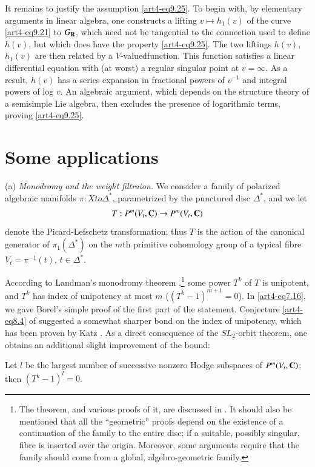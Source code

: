 It remains to justify the assumption \eqref{art4-eq9.25}. To begin with, by elementary arguments in linear algebra, one constructs a lifting $v \longmapsto h_1 (v)$ of the curve \eqref{art4-eq9.21} to $G_{\mathbf{R}}$, which need not be tangential to the connection used to define $h(v)$, but which does have the property \eqref{art4-eq9.25}. The two liftings $h(v)$, $h_1 (v)$ are then related by a $V$-valued\pageoriginale function. This function satisfies a linear differential equation with (at worst) a regular singular point at $v = \infty$. As a result, $h(v)$ has a series expansion in fractional powers of $v^{-1}$ and integral powers of log $v$. An algebraic argument, which depends on the structure theory of a semisimple Lie algebra, then excludes the presence of logarithmic terms, proving \eqref{art4-eq9.25}.


\section{Some applications}\label{art4-sec10}
(a) \textit{Monodromy and the weight filtraion.} We consider a family of polarized algebraic manifolds $\pi: X to \Delta^\ast$, parametrized by the punctured disc $\Delta^\ast$, and we let
$$
T : P^m (V_t, \mathbf{C}) \to P^m (V_t, \mathbf{C})
$$
denote the Picard-Lefschetz transformation; thus $T$ is the action of the canonical generator of $\pi_1 (\Delta^\ast)$ on the $m$th primitive cohomology group of a typical fibre $V_t = \pi^{-1} (t)$, $ t \in \Delta^\ast$.
              
According to Landman's monodromy theorem \cite{art4-key35},\footnote[41]{The theorem, and various proofs of it, are discussed in \cite{art4-key21}. It should also be mentioned that all the ``geometric'' proofs depend on the existence of a continuation of the family to the entire disc; if a suitable, possibly singular, fibre is inserted over the origin. Moreover, some arguments require that the family should come from a global, algebro-geometric family.} some power $T^k$ of $T$ is unipotent, and $T^k$ has index of unipotency at most $m$ (\ie $(T^k -1)^{m+1} =0$). In \eqref{art4-eq7.16}, we gave Borel's simple proof of the first part of the statement. Conjecture \eqref{art4-eq8.4} of \cite{art4-key21} suggested a somewhat sharper bond on the index of unipotency, which has been proven by Katz \cite{art4-key31}. As a direct consequence of the $SL_2$-orbit theorem, one obtains an additional slight improvement of the bound:

\setcounter{proposition}{0}
\begin{proposition}\label{art4-prop10.1}
Let $l$ be the largest number of successive nonzero Hodge subspaces of $P^m (V_t, \mathbf{C})$; then $(T^k - 1)^l = 0$.
\end{proposition}


